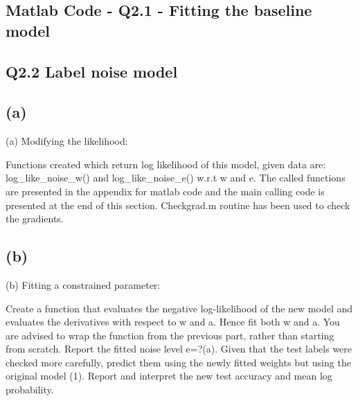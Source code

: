 \documentclass[english]{article}
\begin{document}
\subsection*{Matlab Code - Q2.1 - Fitting the baseline model}


\subsection*{Q2.2 Label noise model}


\subsection*{(a)}
(a) Modifying the likelihood:

Functions created which return log likelihood of this model, given data are:
log_like_noise_w()  and log_like_noise_e() w.r.t w and e. The called functions are
presented in the appendix for matlab code and the main calling code is presented at the
end of this section. Checkgrad.m routine has been used to check the gradients.
\subsection*{(b)}
(b) Fitting a constrained parameter: 

Create a function that evaluates the negative log-likelihood of the new model and
evaluates the derivatives with respect to w and a. Hence fit both w and a. You are
advised to wrap the function from the previous part, rather than starting from scratch.
Report the fitted noise level e=?(a).
Given that the test labels were checked more carefully, predict them using the newly
fitted weights but using the original model (1). Report and interpret the new test
accuracy and mean log probability.

\end{document}
